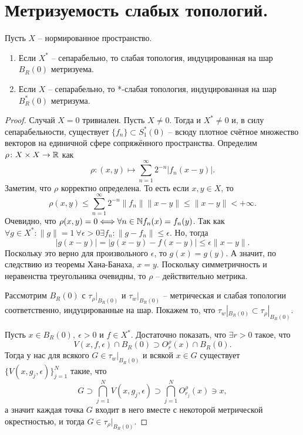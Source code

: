 \section{Метризуемость слабых топологий.}\label{seq:metrizability}
\begin{theorem}
    Пусть $X$ -- нормированное пространство.
    \begin{enumerate}
        \item Если $X^*$ -- сепарабельно, то слабая топология, индуцированная на шар $B_R(0)$ метризуема.
        \item Если $X$ -- сепарабельно, то *-слабая топология, индуцированная на шар $B_R^*(0)$ метризума.
    \end{enumerate}
\end{theorem}
\begin{proof}
    Случай $X = 0$ тривиален.
    Пусть $X \neq 0$.
    Тогда и $X^* \neq 0$ и, в силу сепарабельности, существует $\{f_n\} \subset S_1^*(0)$ -- всюду плотное счётное множество векторов на единичной сфере сопряжённого пространства.
    Определим $\rho\colon X \times X \to \mathbb{R}$ как
    \[
        \rho\colon (x, y) \mapsto \sum_{n = 1}^{\infty} 2^{-n}|f_n(x - y)|.
    \]
    Заметим, что $\rho$ корректно определена.
    То есть если $x, y \in X$, то
    \[
        \rho(x, y) \leq \sum_{n = 1}^{\infty} 2^{-n} \|f_n\|\|x - y\| \leq \|x - y\| < +\infty.
    \]
    Очевидно, что $\rho(x, y) = 0 \Longleftrightarrow \forall n \in \mathbb{N} f_n(x) = f_n(y)$.
    Так как $\forall g \in X^*\colon \|g\| = 1 \ \forall \epsilon > 0 \exists f_n\colon \|g - f_n\| \leq \epsilon$.
    Но, тогда
    \[
        |g(x - y)| = |g(x - y) - f(x - y)| \leq \epsilon \|x - y\|.
    \]
    Поскольку это верно для произвольного $\epsilon$, то $g(x) = g(y)$.
    А значит, по следствию из теоремы Хана-Банаха, $x = y$.
    Поскольку симметричность и неравенства треугольника очевидны, то $\rho$ -- действительно метрика.

    Рассмотрим $B_R(0)$ с $\tau_{\rho}|_{B_R(0)}$ и $\tau_{w}|_{B_R(0)}$ -- метрическая и слабая топологии соответственно, индуцированные на шар.
    Покажем то, что $\tau_w|_{B_R(0)} \subset \tau_\rho|_{B_R(0)}$.

    Пусть $x \in B_R(0), \ \epsilon > 0$ и $f \in X^*$.
    Достаточно показать, что $\exists r > 0$ такое, что
    \[
        V(x, f, \epsilon) \cap B_R(0) \supset O_r^{\rho}(x) \cap B_R(0).
    \]
    Тогда у нас для всякого $G \in \tau_w|_{B_R(0)}$ и всякой $x \in G$ существует $\{V(x, g_j, \epsilon)\}_{j = 1}^{N}$
    такие, что
    \[
        G \supset \bigcap_{j = 1}^{N} V(x, g_j, \epsilon) \supset \bigcap_{j = 1}^{N} O_{r_j}^{\rho}(x) \ni x,
    \]
    а значит каждая точка $G$ входит в него вместе с некоторой метрической окрестностью, и тогда $G \in \tau_\rho|_{B_R(0)}$.


\end{proof}
